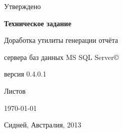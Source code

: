\begin{titlepage}

\begin{center}

	\Large{Утверждено}

\end{center}

\hrulefill

\vspace{8em}

\begin{center}

	\Large{\textbf{Техническое задание}}

\end{center}

\vspace{6em}

\begin{center}

	\Large{Доработка утилиты генерации отчёта}

	\vspace{1.5em}

	\Large{сервера баз данных MS SQL Server{\copyright}}

	\vspace{2.5em}

	\Large{версия 0.4.0.1}

\end{center}

\vspace{6em}

\vspace{\fill}

\begin{center}

	\Large{Листов \pageref{LastPage}}

\end{center}

\vspace{6em}

\hrulefill

\begin{center}

	\Large{\today}

	\vspace{1.5em}

	\Large{Сидней, Австралия, 2013}

\end{center}

\end{titlepage}

